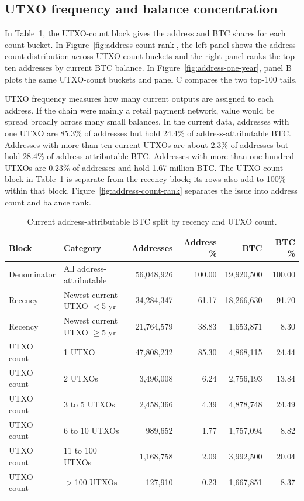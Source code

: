 \documentclass[conference]{IEEEtran}
\begin{document}
\subsection{UTXO frequency and balance concentration}

In Table~\ref{tab:address-numeric}, the UTXO-count block gives the
address and BTC shares for each count bucket. In
Figure~\ref{fig:address-count-rank}, the left panel shows the
address-count distribution across UTXO-count buckets and the right panel
ranks the top ten addresses by current BTC balance. In
Figure~\ref{fig:address-one-year}, panel B plots the same UTXO-count buckets
and panel C compares the two top-100 tails.

UTXO frequency measures how many current outputs are assigned to each
address. If the chain were mainly a retail payment network, value would be
spread broadly across many small balances. In the current data, addresses
with one UTXO are 85.3\% of addresses but hold 24.4\% of
address-attributable BTC. Addresses with more than ten current UTXOs are
about 2.3\% of addresses but hold 28.4\% of address-attributable BTC.
Addresses with more than one hundred UTXOs are 0.23\% of addresses and
hold 1.67 million BTC. The UTXO-count block in
Table~\ref{tab:address-numeric} is separate from the recency block; its rows
also add to 100\% within that block. Figure~\ref{fig:address-count-rank}
separates the issue into address count and balance rank.

\begin{table}[!tbp]
  \centering
  \scriptsize
  \setlength{\tabcolsep}{5pt}
  \renewcommand{\arraystretch}{1.08}
  \begin{tabular}{@{}llrrrr@{}}
    \toprule
    \textbf{Block} & \textbf{Category} & \textbf{Addresses} & \textbf{Address \%} & \textbf{BTC} & \textbf{BTC \%} \\
    \midrule
    Denominator & All address-attributable & 56{,}048{,}926 & 100.00 & 19{,}920{,}500 & 100.00 \\
    \midrule
    Recency & Newest current UTXO $<$5 yr & 34{,}284{,}347 & 61.17 & 18{,}266{,}630 & 91.70 \\
    Recency & Newest current UTXO $\ge$5 yr & 21{,}764{,}579 & 38.83 & 1{,}653{,}871 & 8.30 \\
    \midrule
    UTXO count & 1 UTXO & 47{,}808{,}232 & 85.30 & 4{,}868{,}115 & 24.44 \\
    UTXO count & 2 UTXOs & 3{,}496{,}008 & 6.24 & 2{,}756{,}193 & 13.84 \\
    UTXO count & 3 to 5 UTXOs & 2{,}458{,}366 & 4.39 & 4{,}878{,}748 & 24.49 \\
    UTXO count & 6 to 10 UTXOs & 989{,}652 & 1.77 & 1{,}757{,}094 & 8.82 \\
    UTXO count & 11 to 100 UTXOs & 1{,}168{,}758 & 2.09 & 3{,}992{,}500 & 20.04 \\
    UTXO count & $>$100 UTXOs & 127{,}910 & 0.23 & 1{,}667{,}851 & 8.37 \\
    \bottomrule
  \end{tabular}
  \vspace{1em}
  \caption{Current address-attributable BTC split by recency and UTXO count.}
  \label{tab:address-numeric}
\end{table}
\end{document}
